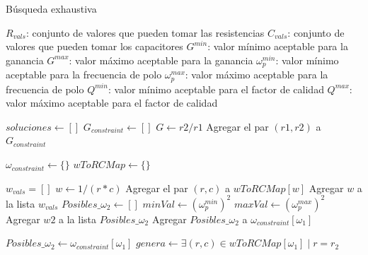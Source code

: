 \documentclass{llncs}
\begin{document}
		\begin{algorithm}[H]
			\caption{Búsqueda exhaustiva}
			\label{alg:exhaustSearch}
			\begin{algorithmic}[1]
				\State $R_{vals}$: conjunto de valores que pueden tomar las resistencias
				\State $C_{vals}$: conjunto de valores que pueden tomar los capacitores
				\State $G^{min}$: valor mínimo aceptable para la ganancia
				\State $G^{max}$: valor máximo aceptable para la ganancia
				\State $\omega_p^{min}$: valor mínimo aceptable para la frecuencia de polo
				\State $\omega_p^{max}$: valor máximo aceptable para la frecuencia de polo
				\State $Q^{min}$: valor mínimo aceptable para el factor de calidad
				\State $Q^{max}$: valor máximo aceptable para el factor de calidad
				\item[]
				\State $soluciones \gets []$
				\State $G_{constraint} \gets  []$ 
				\State $G \gets r2/r1$
				\State Agregar el par $(r1, r2)$ a $G_{constraint}$
				\EndIf 
				\EndFor
				\item[]
				\State $\omega_{constraint} \gets \{\}$ 
				\State $wToRCMap \gets \{\}$  
				\item[]
				\State $w_{vals} = [ ]$
				\State $w \gets 1/(r*c)$
				\State Agregar el par $(r,c)$ a $wToRCMap[w]$
				\State Agregar $w$ a la lista $w_{vals}$
				\EndFor
				\State $Posibles\_\omega_2 \gets [ ]$
				\State $minVal \gets {(\omega_p^{min})}^{2}$
				\State $maxVal \gets {(\omega_p^{max})}^{2}$
				\State Agregar $w2$ a la lista $Posibles\_\omega_2$
				\EndIf
				\EndFor
				\State Agregar $Posibles\_\omega_2$ a $\omega_{constraint}[\omega_1]$
				\EndIf
				\EndFor
				\item[]
				\State $Posibles\_\omega_2 \gets \omega_{constraint}[\omega_1]$
				\State $genera \gets \exists (r,c) \in wToRCMap[\omega_1] \mid r = r_2$ 

\end{algorithmic}
\end{algorithm}
\end{document}

